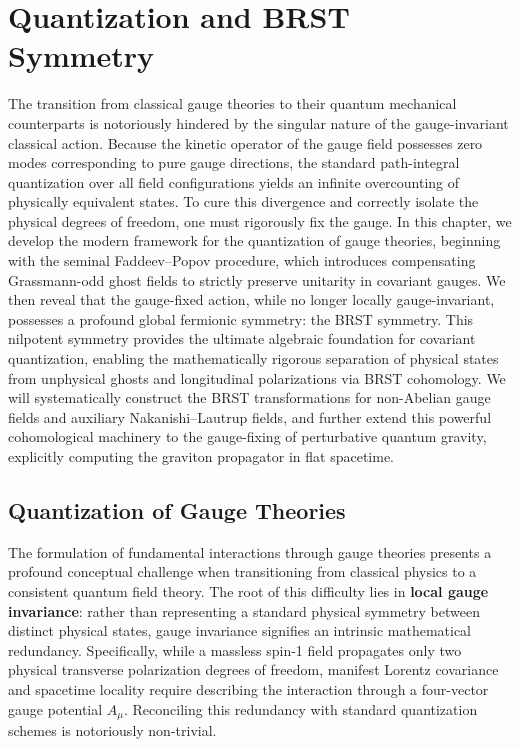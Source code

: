 \chapter[Quantization and BRST Symmetry]{Quantization and BRST\\Symmetry}

The transition from classical gauge theories to their quantum mechanical counterparts is notoriously hindered by the singular nature of the gauge-invariant classical action. Because the kinetic operator of the gauge field possesses zero modes corresponding to pure gauge directions, the standard path-integral quantization over all field configurations yields an infinite overcounting of physically equivalent states. To cure this divergence and correctly isolate the physical degrees of freedom, one must rigorously fix the gauge. In this chapter, we develop the modern framework for the quantization of gauge theories, beginning with the seminal Faddeev--Popov procedure, which introduces compensating Grassmann-odd ghost fields to strictly preserve unitarity in covariant gauges. We then reveal that the gauge-fixed action, while no longer locally gauge-invariant, possesses a profound global fermionic symmetry: the BRST symmetry. This nilpotent symmetry provides the ultimate algebraic foundation for covariant quantization, enabling the mathematically rigorous separation of physical states from unphysical ghosts and longitudinal polarizations via BRST cohomology. We will systematically construct the BRST transformations for non-Abelian gauge fields and auxiliary Nakanishi--Lautrup fields, and further extend this powerful cohomological machinery to the gauge-fixing of perturbative quantum gravity, explicitly computing the graviton propagator in flat spacetime.

\section{Quantization of Gauge Theories}

The formulation of fundamental interactions through gauge theories presents a profound conceptual challenge when transitioning from classical physics to a consistent quantum field theory. The root of this difficulty lies in \textbf{local gauge invariance}: rather than representing a standard physical symmetry between distinct physical states, gauge invariance signifies an intrinsic mathematical redundancy. Specifically, while a massless spin-1 field propagates only two physical transverse polarization degrees of freedom, manifest Lorentz covariance and spacetime locality require describing the interaction through a four-vector gauge potential $A_\mu$. Reconciling this redundancy with standard quantization schemes is notoriously non-trivial.

